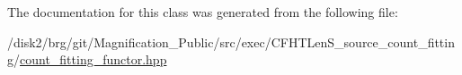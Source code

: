 The documentation for this class was generated from the following file\+:\begin{DoxyCompactItemize}
\item 
/disk2/brg/git/\+Magnification\+\_\+\+Public/src/exec/\+C\+F\+H\+T\+Len\+S\+\_\+source\+\_\+count\+\_\+fitting/\hyperlink{count__fitting__functor_8hpp}{count\+\_\+fitting\+\_\+functor.\+hpp}\end{DoxyCompactItemize}
